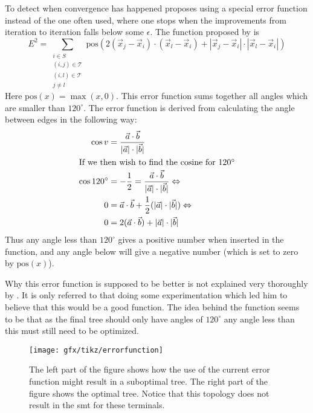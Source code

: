 To detect when convergence has happened \citeauthor{smith1992} proposes using a special
error function instead of the one often used, where one stops when the
improvements from iteration to iteration falls below some $\epsilon$. The
function proposed by \citeauthor{smith1992} is
%
\begin{equation}
  E^2 = \sum_{
    \begin{array}{c} i \in S \\ (i,j) \in \mathcal{T} \\ (i,l) \in \mathcal{T} \\ j \ne l
    \end{array}} \text{pos} (2 (\vec x_j - \vec x_i) \cdot (\vec x_l - \vec x_i)
  + | \vec x_j - \vec x_i | \cdot | \vec x_l - \vec x_i |) \label{eq:28}
\end{equation}
%
Here $\text{pos}(x) = \max(x, 0)$. This error function sums together all angles which
are smaller than $120^{\circ}$. The error function is derived from calculating
the angle between edges in the following way:
%
\begin{align}
  \cos v & = \frac{\vec a \cdot \vec b}
           {|\vec a| \cdot |\vec b|}                 \\
  \intertext{If we then wish to find the cosine for $120^{\circ}$}
  \cos 120^{\circ}
         & = -\frac{1}{2} = \frac{\vec a \cdot \vec b}
           {|\vec a| \cdot |\vec b|} \Leftrightarrow \\
  0      & = \vec a \cdot \vec b + \frac{1}{2}
           (|\vec a| \cdot |\vec b|) \Leftrightarrow \\
  0      & = 2 (\vec a \cdot \vec b) + |\vec a| \cdot |\vec b|
\end{align}
%
Thus any angle less than $120^{\circ}$ gives a positive number when inserted in
the function, and any angle below will give a negative number (which is set to
zero by $\text{pos}(x)$).

Why this error function is supposed to be better is not explained very
thoroughly by \citeauthor{smith1992}. It is only referred to that doing some
experimentation which led him to believe that this would be a good function. The
idea behind the function seems to be that as the final tree should only have
angles of $120^{\circ}$ any angle less than this must still need to be
optimized.

\begin{figure}[htbp]
  \centering
  \texttt{[image: gfx/tikz/errorfunction]}
  \caption[Possible problem with the error function, part 1]{The left part of the figure
    shows how the use of the current error function might result in a suboptimal
    tree. The right part of the figure shows the optimal tree. Notice that
    this topology does not result in the \ac{smt} for these
    terminals.\label{fig:error-function}}
\end{figure}

